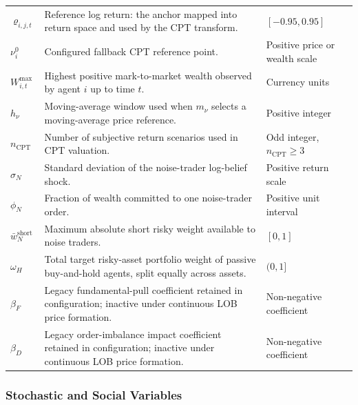 \documentclass[12pt, a4paper]{article}
\begin{document}
\begin{longtable}{@{}L{0.22\textwidth}L{0.50\textwidth}L{0.20\textwidth}@{}}
        \(\varrho_{i,j,t}\) & Reference log return: the anchor mapped into return space and used by the CPT transform. & \([-0.95,0.95]\) \\
        \(\nu_i^0\) & Configured fallback CPT reference point. & Positive price or wealth scale \\
        \(W_{i,t}^{\max}\) & Highest positive mark-to-market wealth observed by agent \(i\) up to time \(t\). & Currency units \\
        \(h_{\nu}\) & Moving-average window used when \(m_{\nu}\) selects a moving-average price reference. & Positive integer \\
        \(n_{\mathrm{CPT}}\) & Number of subjective return scenarios used in CPT valuation. & Odd integer, \(n_{\mathrm{CPT}}\ge3\) \\
        \(\sigma_N\) & Standard deviation of the noise-trader log-belief shock. & Positive return scale \\
        \(\phi_N\) & Fraction of wealth committed to one noise-trader order. & Positive unit interval \\
        \(\bar w_N^{\text{short}}\) & Maximum absolute short risky weight available to noise traders. & \([0,1]\) \\
        \(\omega_H\) & Total target risky-asset portfolio weight of passive buy-and-hold agents, split equally across assets. & \((0,1]\) \\
        \(\beta_F\) & Legacy fundamental-pull coefficient retained in configuration; inactive under continuous LOB price formation. & Non-negative coefficient \\
        \(\beta_D\) & Legacy order-imbalance impact coefficient retained in configuration; inactive under continuous LOB price formation. & Non-negative coefficient \\
        \bottomrule
    \end{longtable}

    \subsubsection*{Stochastic and Social Variables}
\end{document}

